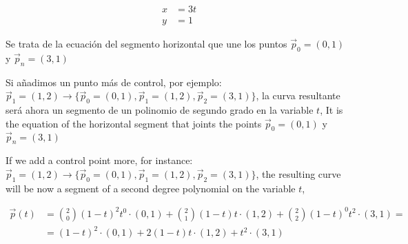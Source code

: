 \begin{align*}
x &= 3t\\
y &= 1
\end{align*}
\begin{paracol}{2}
Se trata de la ecuación del segmento horizontal que une los puntos $\vec{p}_0 = (0,1)$ y $\vec{p}_n = (3,1)$ 

Si añadimos un punto más de control, por ejemplo:  $\vec{p}_1 = (1,2) \rightarrow \lbrace\vec{p}_0 = (0,1), \vec{p}_1 = (1,2), \vec{p}_2 = (3,1)\rbrace$,  la curva resultante será ahora un segmento de un polinomio de segundo grado en la variable $t$,
\switchcolumn
It is the equation of the horizontal segment that joints the points $\vec{p}_0 = (0,1)$ y $\vec{p}_n = (3,1)$

If we add a control point more, for instance:  $\vec{p}_1 = (1,2) \rightarrow \lbrace\vec{p}_0 = (0,1), \vec{p}_1 = (1,2), \vec{p}_2 = (3,1)\rbrace$, the resulting curve will be now a segment of a second degree polynomial on the variable $t$,
\end{paracol}
\begin{align*}
\vec{p}(t) &= \binom{2}{0}\left(1-t\right)^{2}t^0  \cdot (0,1) +  \binom{2}{1}\left(1-t\right)t \cdot (1,2) + \binom{2}{2}\left(1-t\right)^{0}t^2  \cdot (3,1) =\\
&= \left(1-t\right)^{2} \cdot (0,1) + 2 \left(1-t\right)t \cdot (1,2) + t^2  \cdot (3,1) 
\end{align*} 
